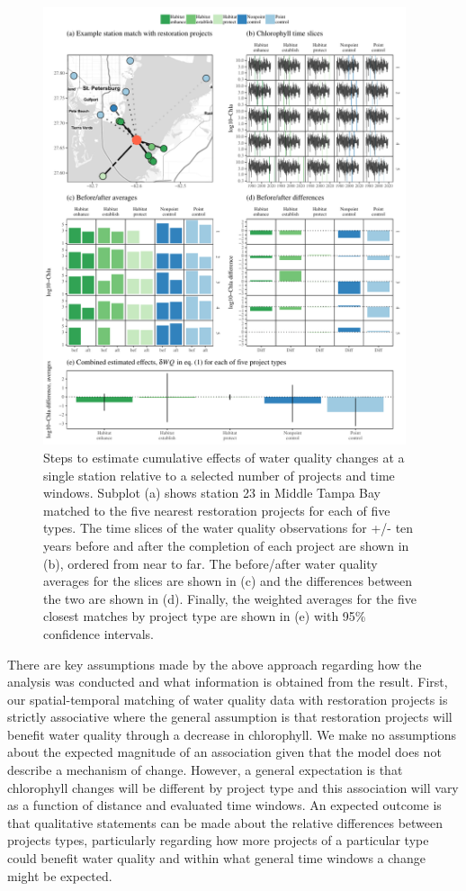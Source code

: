 \documentclass[]{article}
\begin{document}
\begin{figure}
\centerline{\includegraphics[width = 0.95\textwidth]{figs/statex.pdf}}
\caption{Steps to estimate cumulative effects of water quality changes at a single station relative to a selected number of projects and time windows. Subplot (a) shows station 23 in Middle Tampa Bay matched to the five nearest restoration projects for each of five types.  The time slices of the water quality observations for +/- ten years before and after the completion of each project are shown in (b), ordered from near to far.  The before/after water quality averages for the slices are shown in (c) and the differences between the two are shown in (d).  Finally, the weighted averages for the five closest matches by project type are shown in (e) with 95\% confidence intervals. }
\label{fig:statex}
\end{figure}

There are key assumptions made by the above approach regarding how the
analysis was conducted and what information is obtained from the result.
First, our spatial-temporal matching of water quality data with
restoration projects is strictly associative where the general
assumption is that restoration projects will benefit water quality
through a decrease in chlorophyll. We make no assumptions about the
expected magnitude of an association given that the model does not
describe a mechanism of change. However, a general expectation is that
chlorophyll changes will be different by project type and this
association will vary as a function of distance and evaluated time
windows. An expected outcome is that qualitative statements can be made
about the relative differences between projects types, particularly
regarding how more projects of a particular type could benefit water
quality and within what general time windows a change might be expected.
\end{document}
